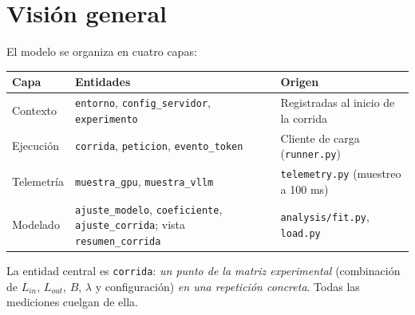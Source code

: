 \documentclass[11pt,a4paper]{article}
\newcommand{\campo}[1]{\texttt{#1}}
\begin{document}
\section{Visión general}
El modelo se organiza en cuatro capas:

\begin{center}
\begin{tabular}{@{}>{\raggedright}p{2.4cm}>{\raggedright}p{6.4cm}>{\raggedright\arraybackslash}p{6.4cm}@{}}
\toprule
\textbf{Capa} & \textbf{Entidades} & \textbf{Origen}\\
\midrule
Contexto & \campo{entorno}, \campo{config_servidor}, \campo{experimento} & Registradas al inicio de la corrida\\
Ejecución & \campo{corrida}, \campo{peticion}, \campo{evento_token} & Cliente de carga (\texttt{runner.py})\\
Telemetría & \campo{muestra_gpu}, \campo{muestra_vllm} & \texttt{telemetry.py} (muestreo a 100 ms)\\
Modelado & \campo{ajuste_modelo}, \campo{coeficiente}, \campo{ajuste_corrida}; vista \campo{resumen_corrida} & \texttt{analysis/fit.py}, \texttt{load.py}\\
\bottomrule
\end{tabular}
\end{center}

La entidad central es \campo{corrida}: \emph{un punto de la matriz experimental} (combinación de $L_{in}$, $L_{out}$, $B$, $\lambda$ y configuración) \emph{en una repetición concreta}. Todas las mediciones cuelgan de ella.
\end{document}
